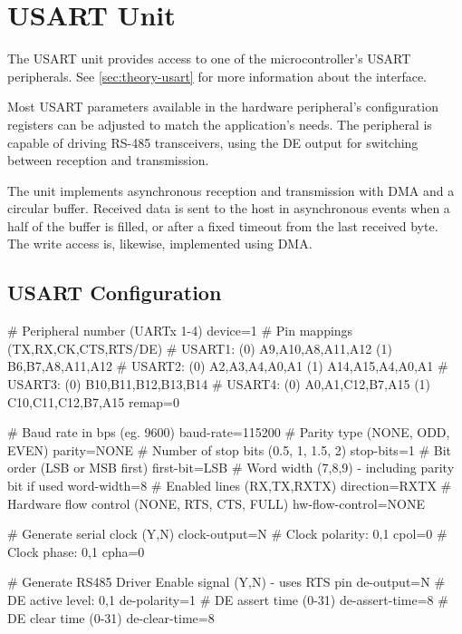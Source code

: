 \section{USART Unit}

The \gls{USART} unit provides access to one of the microcontroller's \gls{USART} peripherals. See \cref{sec:theory-usart} for more information about the interface.

Most \gls{USART} parameters available in the hardware peripheral's configuration registers can be adjusted to match the application's needs. The peripheral is capable of driving RS-485 transceivers, using the \gls{DE} output for switching between reception and transmission.

The unit implements asynchronous reception and transmission with \gls{DMA} and a circular buffer. Received data is sent to the host in asynchronous events when a half of the buffer is filled, or after a fixed timeout from the last received byte. The write access is, likewise, implemented using \gls{DMA}.


\subsection{USART Configuration}

\begin{inicode}
# Peripheral number (UARTx 1-4)
device=1
# Pin mappings (TX,RX,CK,CTS,RTS/DE)
#  USART1: (0) A9,A10,A8,A11,A12   (1) B6,B7,A8,A11,A12
#  USART2: (0) A2,A3,A4,A0,A1      (1) A14,A15,A4,A0,A1
#  USART3: (0) B10,B11,B12,B13,B14
#  USART4: (0) A0,A1,C12,B7,A15    (1) C10,C11,C12,B7,A15
remap=0

# Baud rate in bps (eg. 9600)
baud-rate=115200
# Parity type (NONE, ODD, EVEN)
parity=NONE
# Number of stop bits (0.5, 1, 1.5, 2)
stop-bits=1
# Bit order (LSB or MSB first)
first-bit=LSB
# Word width (7,8,9) - including parity bit if used
word-width=8
# Enabled lines (RX,TX,RXTX)
direction=RXTX
# Hardware flow control (NONE, RTS, CTS, FULL)
hw-flow-control=NONE

# Generate serial clock (Y,N)
clock-output=N
# Clock polarity: 0,1
cpol=0
# Clock phase: 0,1
cpha=0

# Generate RS485 Driver Enable signal (Y,N) - uses RTS pin
de-output=N
# DE active level: 0,1
de-polarity=1
# DE assert time (0-31)
de-assert-time=8
# DE clear time (0-31)
de-clear-time=8
\end{inicode}


